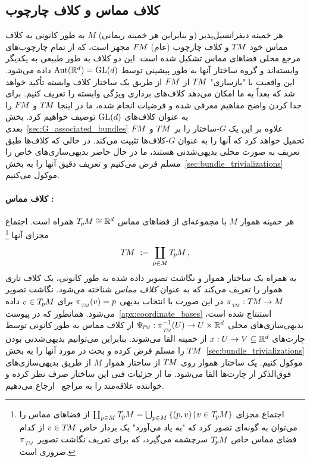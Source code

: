 

\subsection{کلاف مماس  و کلاف چارچوب }
\label{sec:GL_associated_bundles}


هر خمینه دیفرانسیل‌پذیر (و بنابراین هر خمینه ریمانی) $M$ به طور کانونی به کلاف مماس خود $T\mkern-1.5muM$ و کلاف چارچوب (عام) $F\mkern-1.5muM$ مجهز است، که از تمام چارچوب‌های مرجع محلی فضاهای مماس تشکیل شده است.
این دو کلاف به طور طبیعی به یکدیگر وابسته‌اند و گروه ساختار آنها به طور پیشینی توسط $\operatorname{Aut}(\mathbb{R}^d) = \operatorname{GL}(d)$ داده می‌شود.
این واقعیت با "بازسازی" $T\mkern-1.5muM$ از $F\mkern-1.5muM$ از طریق یک ساختار کلاف وابسته تأکید خواهد شد که بعداً به ما امکان می‌دهد کلاف‌های برداری ویژگی وابسته را تعریف کنیم.
برای جدا کردن واضح مفاهیم معرفی شده و فرضیات انجام شده، ما در اینجا $T\mkern-1.5muM$ و $F\mkern-1.5muM$ را به عنوان کلاف‌های $\operatorname{GL}(d)$ توصیف خواهیم کرد.
بخش بعدی~\ref{sec:G_associated_bundles} علاوه بر این یک $G$-ساختار را بر $T\mkern-1.5muM$ و $F\mkern-1.5muM$ تحمیل خواهد کرد که آنها را به عنوان $G$-کلاف‌ها تثبیت می‌کند.
در حالی که کلاف‌ها طبق تعریف به صورت محلی بدیهی‌شدنی هستند، ما در حال حاضر بدیهی‌سازی‌های خاص را مسلم فرض می‌کنیم و تعریف دقیق آنها را به بخش~\ref{sec:bundle_trivializations} موکول می‌کنیم.


\paragraph{کلاف مماس :}

هر خمینه هموار $M$ با مجموعه‌ای از فضاهای مماس $T_{\mkern-1.5mu p}\mkern-.5muM\cong\mathbb{R}^d$ همراه است.
اجتماع مجزای آنها%
\footnote{%
	اجتماع مجزای $\coprod_{p\in M} T_{\mkern-1.5mu p}\mkern-.5muM = \bigcup_{p\in M} \left\{(p,v) \,|\, v\in T_{\mkern-1.5mu p}\mkern-.5muM\right\}$ از فضاهای مماس را می‌توان به گونه‌ای تصور کرد که "به یاد می‌آورد" یک بردار خاص $v\in T\mkern-1.5muM$ از کدام فضای مماس خاص $T_{\mkern-1.5mu p}\mkern-.5muM$ سرچشمه می‌گیرد، که برای تعریف نگاشت تصویر $\piTM$ ضروری است.
}
\begin{align}
	T\mkern-1.5muM\ :=\, \coprod_{p\in M} T_{\mkern-1.5mu p}\mkern-.5muM \,,
\end{align}
به همراه یک ساختار هموار و نگاشت تصویر داده شده به طور کانونی، یک کلاف تاری هموار را تعریف می‌کند که به عنوان \emph{کلاف مماس} شناخته می‌شود.
نگاشت تصویر ${\piTM: \TM\to M}$ در این صورت با انتخاب بدیهی ${\piTM(v)=p}$ برای $v\in T_{\mkern-1.5mu p}\mkern-.5muM$ داده می‌شود.
همانطور که در پیوست~\ref{apx:coordinate_bases} استنتاج شده است، بدیهی‌سازی‌های محلی $\PsiTM: \piTM^{-1}(U) \to U\times \R^d$ از کلاف مماس به طور کانونی توسط چارت‌های $x:U\to V\subseteq \mathbb{R}^d$ از خمینه القا می‌شوند.
بنابراین می‌توانیم بدیهی‌شدنی بودن $T\mkern-1.5muM$ را مسلم فرض کرده و بحث در مورد آنها را به بخش~\ref{sec:bundle_trivializations} موکول کنیم.
یک ساختار هموار روی $T\mkern-1.5muM$ از ساختار هموار $M$ از طریق بدیهی‌سازی‌های فوق‌الذکر از چارت‌ها القا می‌شود.
ما از جزئیات فنی این ساختار صرف نظر کرده و خواننده علاقه‌مند را به مراجع~\cite{schullerGeometricalAnatomy2016,nakahara2003geometry} ارجاع می‌دهیم.

